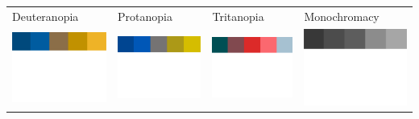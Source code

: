 \documentclass[aspectratio=169]{beamer}
\begin{document}
\begin{frame}[c]
\pause
\vspace{4mm}
\small
\begin{tabular}{@{}p{}@{}p{}@{}p{}@{}p{}@{}}
Deuteranopia & Protanopia & Tritanopia & Monochromacy\\
\includegraphics[width=.2\textwidth]{palettes/qualitative-palette-deuteranopia.png} & \includegraphics[width=.2\textwidth]{palettes/qualitative-palette-protanopia.png} & \includegraphics[width=.2\textwidth]{palettes/qualitative-palette-tritanopia.png} & \includegraphics[width=.2\textwidth]{palettes/qualitative-palette-monochrome.png}\\
\end{tabular}


\end{frame}






\end{document}

